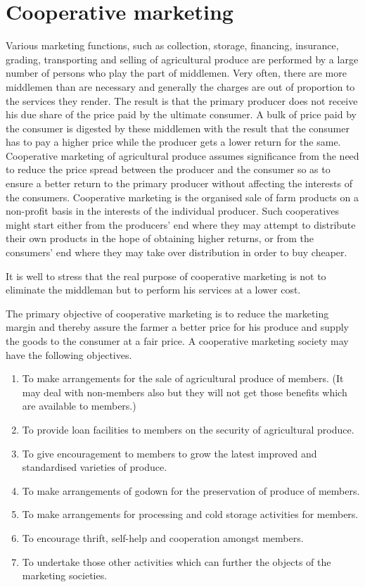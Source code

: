 \documentclass[11pt,]{book}
\providecommand{\tightlist}{%
  \setlength{\itemsep}{0pt}\setlength{\parskip}{0pt}}
\theoremstyle{definition}
\theoremstyle{definition}
\theoremstyle{definition}
\theoremstyle{remark}
\begin{document}
\section{Cooperative marketing}\label{cooperative-marketing}

Various marketing functions, such as collection, storage, financing,
insurance, grading, transporting and selling of agricultural produce are
performed by a large number of persons who play the part of middlemen.
Very often, there are more middlemen than are necessary and generally
the charges are out of proportion to the services they render. The
result is that the primary producer does not receive his due share of
the price paid by the ultimate consumer. A bulk of price paid by the
consumer is digested by these middlemen with the result that the
consumer has to pay a higher price while the producer gets a lower
return for the same. Cooperative marketing of agricultural produce
assumes significance from the need to reduce the price spread between
the producer and the consumer so as to ensure a better return to the
primary producer without affecting the interests of the consumers.
Cooperative marketing is the organised sale of farm products on a
non-profit basis in the interests of the individual producer. Such
cooperatives might start either from the producers' end where they may
attempt to distribute their own products in the hope of obtaining higher
returns, or from the consumers' end where they may take over
distribution in order to buy cheaper.

It is well to stress that the real purpose of cooperative marketing is
not to eliminate the middleman but to perform his services at a lower
cost.

The primary objective of cooperative marketing is to reduce the
marketing margin and thereby assure the farmer a better price for his
produce and supply the goods to the consumer at a fair price. A
cooperative marketing society may have the following objectives.

\begin{enumerate}
\def\labelenumi{\arabic{enumi}.}
\tightlist
\item
  To make arrangements for the sale of agricultural produce of members.
  (It may deal with non-members also but they will not get those
  benefits which are available to members.)
\item
  To provide loan facilities to members on the security of agricultural
  produce.
\item
  To give encouragement to members to grow the latest improved and
  standardised varieties of produce.
\item
  To make arrangements of godown for the preservation of produce of
  members.
\item
  To make arrangements for processing and cold storage activities for
  members.
\item
  To encourage thrift, self-help and cooperation amongst members.
\item
  To undertake those other activities which can further the objects of
  the marketing societies.
\end{enumerate}
\end{document}
